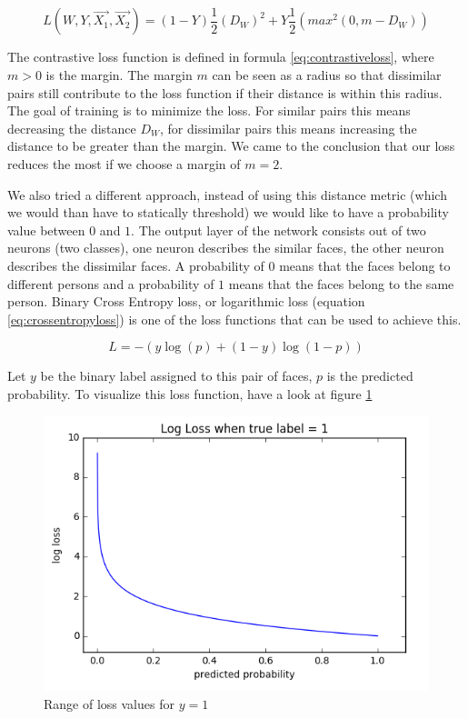 \begin{equation} \label{eq:contrastiveloss}
  L(W,Y,\vec{X_{1}},\vec{X_{2}})=(1-Y)\frac{1}{2}(D_{W})^{2} + Y\frac{1}{2}(max^{2}(0, m - D_{W}))
\end{equation}

The contrastive loss function is defined in formula \ref{eq:contrastiveloss}, where $m > 0$ is the margin. The margin $m$ can be seen as a radius so that dissimilar pairs still contribute to the loss function if their distance is within this radius. The goal of training is to minimize the loss. For similar pairs this means decreasing the distance $D_{W}$, for dissimilar pairs this means increasing the distance to be greater than the margin. We came to the conclusion that our loss reduces the most if we choose a margin of $m=2$.

We also tried a different approach, instead of using this distance metric (which we would than have to statically threshold) we would like to have a probability value between $0$ and $1$. The output layer of the network consists out of two neurons (two classes), one neuron describes the similar faces, the other neuron describes the dissimilar faces. A probability of $0$ means that the faces belong to different persons and a probability of $1$ means that the faces belong to the same person. Binary Cross Entropy loss, or logarithmic loss (equation \ref{eq:crossentropyloss}) is one of the loss functions that can be used to achieve this.

\begin{equation} \label{eq:crossentropyloss}
  L=-{(y\log(p) + (1 - y)\log(1 - p))}
\end{equation}

Let $y$ be the binary label assigned to this pair of faces, $p$ is the predicted probability. To visualize this loss function, have a look at figure \ref{fig:crossentropyloss}

\begin{figure}[H]
  \includegraphics[scale=0.6]{fig/cross_entropy.png}
  \centering
  \caption{Range of loss values for $y=1$}
  \label{fig:crossentropyloss}
\end{figure}

